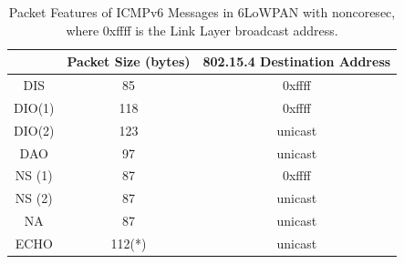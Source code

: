\begin{table}[ht!]
	\center
	\begin{tabular}{|c|c|c|}
		\hline
		       & Packet Size (bytes) & 802.15.4 Destination Address \\ \hline
		DIS    & 85                  & 0xffff                       \\ \hline
		DIO(1) & 118                 & 0xffff                       \\ \hline
		DIO(2) & 123                 & unicast                      \\ \hline
		DAO    & 97                  & unicast                      \\ \hline
		NS (1) & 87                  & 0xffff                       \\ \hline
		NS (2) & 87                  & unicast                      \\ \hline
		NA     & 87                  & unicast                      \\ \hline
		ECHO   & 112(*)               & unicast                      \\ \hline
	\end{tabular}
	\caption{Packet Features of ICMPv6 Messages in 6LoWPAN with noncoresec, where 0xffff is the Link Layer broadcast address.}
	\label{Tbl: Packet Features of ICMPv6 Messages in 6LoWPAN with noncoresec}
\end{table}


